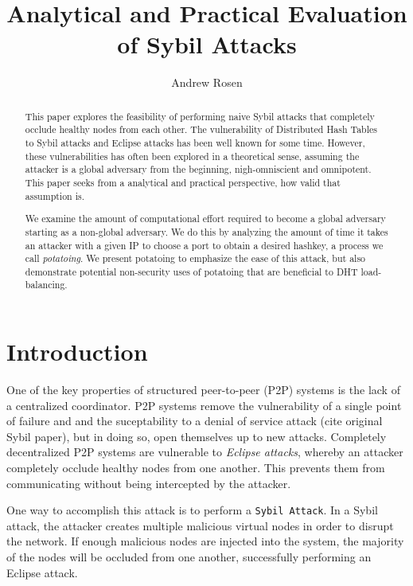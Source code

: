 \documentclass[10pt,a4paper]{article}
\author{Andrew Rosen}
\title{Analytical and Practical Evaluation of Sybil Attacks}
\begin{document}
\maketitle



\begin{abstract}
This paper explores the feasibility of performing naive Sybil attacks that completely occlude healthy nodes from each other.
The vulnerability of Distributed Hash Tables to Sybil attacks and Eclipse attacks has been well known for some time.
However, these vulnerabilities has often been explored in a theoretical sense, assuming the attacker is a global adversary from the beginning, nigh-omniscient and omnipotent. 
This paper seeks from a analytical and practical perspective, how valid that assumption is.

We examine the amount of computational effort required to become a global adversary starting as a non-global adversary.
We do this by analyzing the amount of time it takes an attacker with a given IP to choose a port to obtain a desired hashkey, a process we call \emph{potatoing}.
We present potatoing to emphasize the ease of this attack, but also demonstrate potential non-security uses of potatoing that are beneficial to DHT load-balancing. 
\end{abstract}

\section{Introduction}
One of the key properties of structured peer-to-peer (P2P) systems is the lack of a centralized coordinator.
P2P systems remove the vulnerability of a single point of failure and and the suceptability to a denial of service attack (cite original Sybil paper), but in doing so, open themselves up to new attacks.
Completely decentralized P2P systems are vulnerable to \textit{Eclipse attacks}, whereby an attacker completely occlude healthy nodes from one another.
This prevents them from communicating without being intercepted by the attacker.

One way to accomplish this attack is to perform a \texttt{Sybil Attack}.
In a Sybil attack, the attacker creates multiple malicious virtual nodes in order to disrupt the network.
If enough malicious nodes are injected into the system, the majority of the nodes will be occluded from one another, successfully performing an Eclipse attack.
\end{document}
